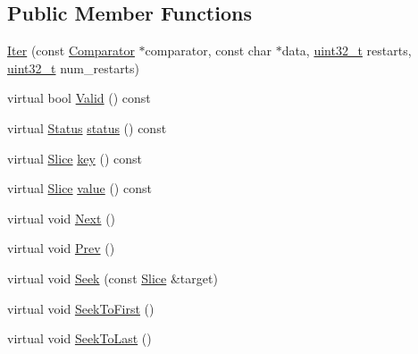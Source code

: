 \subsection*{Public Member Functions}
\begin{DoxyCompactItemize}
\item 
\hyperlink{classleveldb_1_1_block_1_1_iter_a31b124ec1fc5750b31b182dc44282588}{Iter} (const \hyperlink{structleveldb_1_1_comparator}{Comparator} $\ast$comparator, const char $\ast$data, \hyperlink{stdint_8h_a435d1572bf3f880d55459d9805097f62}{uint32\+\_\+t} restarts, \hyperlink{stdint_8h_a435d1572bf3f880d55459d9805097f62}{uint32\+\_\+t} num\+\_\+restarts)
\item 
virtual bool \hyperlink{classleveldb_1_1_block_1_1_iter_ac4be155bfc93e1d2b90cfd670f22c1ba}{Valid} () const 
\item 
virtual \hyperlink{classleveldb_1_1_status}{Status} \hyperlink{classleveldb_1_1_block_1_1_iter_a39f400b72dc79931145600a702b71c61}{status} () const 
\item 
virtual \hyperlink{classleveldb_1_1_slice}{Slice} \hyperlink{classleveldb_1_1_block_1_1_iter_a1378d5e1fb17638427fd0a0f7fc7a010}{key} () const 
\item 
virtual \hyperlink{classleveldb_1_1_slice}{Slice} \hyperlink{classleveldb_1_1_block_1_1_iter_afb28e69efec54ca9306fc504e139bf3f}{value} () const 
\item 
virtual void \hyperlink{classleveldb_1_1_block_1_1_iter_a27dacbefa903333a5ad003ccd3e424b6}{Next} ()
\item 
virtual void \hyperlink{classleveldb_1_1_block_1_1_iter_a096747ff77d5090579fe4cd4e464a3c9}{Prev} ()
\item 
virtual void \hyperlink{classleveldb_1_1_block_1_1_iter_a3dcefc0609937b33c046ac7fafb52ad7}{Seek} (const \hyperlink{classleveldb_1_1_slice}{Slice} \&target)
\item 
virtual void \hyperlink{classleveldb_1_1_block_1_1_iter_aecc19bb6d8a219e7fb8e695fb5b57bd3}{Seek\+To\+First} ()
\item 
virtual void \hyperlink{classleveldb_1_1_block_1_1_iter_a3007d98d17a03138c629fc2b2eb56204}{Seek\+To\+Last} ()
\end{DoxyCompactItemize}
